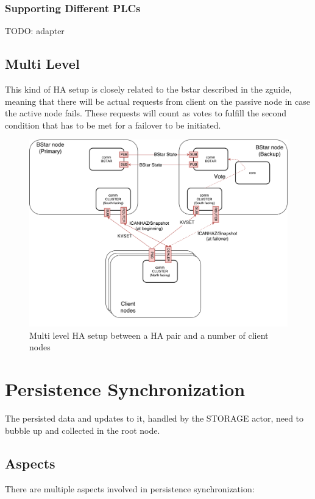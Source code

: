 \subsubsection{Supporting Different PLCs}
TODO: adapter

\subsection{Multi Level}
This kind of \gls{HA} setup is closely related to the \gls{bstar} described
in the \gls{zguide}, meaning that there will be actual requests from client on the
passive node in case the active node fails. These requests will count as votes
to fulfill the second condition that has to be met for a failover to be
initiated.

\begin{figure}[!ht]
	\includegraphics[width=\textwidth]{img/ML-HA_bstar.pdf}
	\caption{Multi level HA setup between a HA pair and a number of client nodes}
	\label{fig:ml-ha}
\end{figure}

\section{Persistence Synchronization}\label{sec:meth:psync}
The persisted data and updates to it, handled by the STORAGE actor, need to
bubble up and collected in the root node.

\subsection{Aspects}
There are multiple aspects involved in persistence synchronization:

